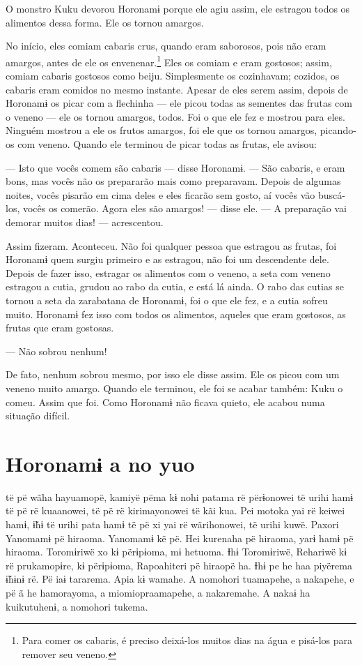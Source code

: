O monstro Kuku devorou Horonamɨ porque ele agiu assim, ele
 estragou todos os alimentos dessa forma. Ele os tornou amargos. 

No início, eles comiam cabaris crus, quando eram saborosos, pois não
eram amargos, antes de ele os envenenar.\footnote{Para comer os cabaris, é 
preciso deixá-los muitos dias na água e pisá-los para remover seu 
veneno.} Eles os comiam e eram gostosos; assim, comiam cabaris gostosos como beiju. Simplesmente os cozinhavam;
cozidos, os cabaris eram comidos no mesmo instante. Apesar de eles serem
assim, depois de Horonamɨ os picar com a flechinha --- ele picou todas
as sementes das frutas com o veneno --- ele os tornou amargos, todos.
Foi o que ele fez e mostrou para eles. Ninguém mostrou a ele os frutos
amargos, foi ele que os tornou amargos, picando-os com veneno. Quando
ele terminou de picar todas as frutas, ele avisou: 

--- Isto que vocês comem são cabaris --- disse Horonamɨ. --- São
cabaris, e eram bons, mas vocês não os prepararão mais como preparavam.
Depois de algumas noites, vocês pisarão em cima deles e eles ficarão sem
gosto, aí vocês vão buscá-los, vocês os comerão. Agora eles são
amargos! --- disse ele. --- A preparação vai demorar muitos
dias! --- acrescentou. 

Assim fizeram. Aconteceu. Não foi qualquer pessoa que estragou as
 frutas, foi Horonamɨ quem surgiu primeiro e as estragou, não foi um
 descendente dele. Depois de fazer isso, estragar os alimentos com o
 veneno, a seta com veneno estragou a cutia, grudou ao rabo da cutia, e
 está lá ainda. O rabo das cutias se tornou a seta da zarabatana de
 Horonamɨ, foi o que ele fez, e a cutia sofreu muito. Horonamɨ fez isso
 com todos os alimentos, aqueles que eram gostosos, as frutas que eram
 gostosas. 

--- Não sobrou nenhum!

De fato, nenhum sobrou mesmo, por isso ele disse assim. Ele os picou com
um veneno muito amargo. Quando ele terminou, ele foi se acabar também:
Kuku o comeu. Assim que foi. Como Horonamɨ não ficava quieto, ele acabou
numa situação difícil. 

\chapter{Horonamɨ a no yuo}

 të pë wãha hayuamopë, kamiyë pëma kɨ nohi patama rë përɨonowei të
urihi hamɨ të pë rë kuaanowei, të pë rë kirimayonowei të kãi kua. Pei
motoka yai rë keiwei hamɨ, ɨ̃hɨ të urihi pata hamɨ të pë xi yai rë
wãrihonowei, të urihi kuwë. Paxori Yanomamɨ pë hiraoma. Yanomamɨ kë pë.
Hei kurenaha pë hiraoma, yarɨ hamɨ pë hiraoma. Toromɨriwë xo kɨ
përɨpɨoma, mɨ hetuoma. Ɨhɨ Toromɨriwë, Rehariwë kɨ rë prukamopɨre, kɨ
përɨpɨoma, Rapoahiteri pë hiraopë ha. Ɨhɨ pe he haa piyërema ɨ̃hɨnɨ rë. Pë
iaɨ tararema. Apia kɨ wamahe. A nomohori tuamapehe, a nakapehe, e pë ã
he hamorayoma, a miomiopraamapehe, a nakaremahe. A nakaɨ ha kuikutuhenɨ,
a nomohori tukema. 

